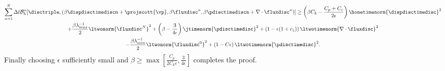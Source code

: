 \begin{multline}
\sum_{n=1}^{N} \Delta t  \mathcal{B}_{h}^{n}[\disctriple, ( \beta \dispdisctimediscn + \projscott {\vp},  \beta \fluxdisc^{n}, \beta\pdisctimediscn   + \nabla \cdot \fluxdisc^{n}  )]  \geq \left( \beta C_{k}  - \frac{C_{p}+C_{c}}{2 \epsilon } \right) \honetimenorm{\dispdisctimedisc}^{2}    \\ + \frac{\beta\lambda_{max}^{-1}}{2} \ltwonorm{\fluxdisc^{N}}^{2}  +\left(\beta -   \frac{3}{4 \epsilon}\right) \jtimenorm{\pdisctimedisc}^{2} +\left(1 -  {\epsilon}(1+c_{z})\right) \ltwotimenorm{\nabla \cdot \fluxdisc }^{2} \\ -\frac{ \beta \lambda_{min}^{-1} }{2}\ltwonorm{\fluxdisc^{0}}^{2}  + \left(1-C{\epsilon}\right) \ltwotimenorm{\pdisctimedisc}^{2}. 
\label{eqn:lemmabstar_final} 
\end{multline}
Finally choosing $\epsilon$ sufficiently small and $\beta \geq \max \left[ \frac{C_{p}}{2 C_{k} \epsilon }, \frac{3}{4 \epsilon }\right] $ completes the proof.
